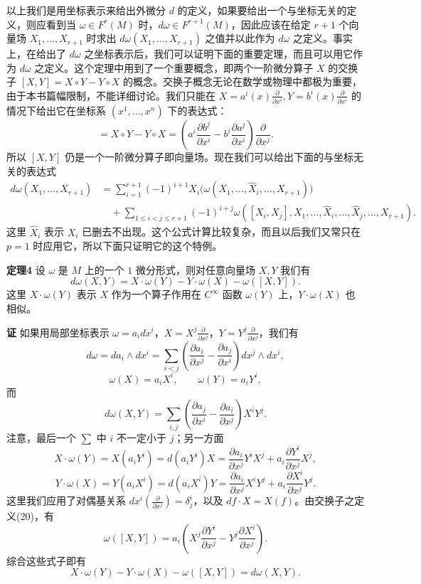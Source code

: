 以上我们是用坐标表示来给出外微分 $d$ 的定义，如果要给出一个与坐标无关的定义，则应看到当 $\omega\in F^r(M)$ 时，$d\omega\in F^{r+1}(M)$，因此应该在给定 $r+1$ 个向量场 $X_1,\ldots,X_{r+1}$ 时求出 $d\omega(X_1,\ldots,X_{r+1})$ 之值并以此作为 $d\omega$ 之定义。事实上，在给出了 $d\omega$ 之坐标表示后，我们可以证明下面的重要定理，而且可以用它作为 $d\omega$ 之定义。这个定理中用到了一个重要概念，即两个一阶微分算子 $X$ 的交换子 $[X,Y]=X\circ Y-Y\circ X$ 的概念。交换子概念无论在数学或物理中都极为重要，由于本书篇幅限制，不能详细讨论。我们只能在 $X=a^i(x)\frac{\partial}{\partial x^i},Y=b^i(x)\frac{\partial}{\partial x^i}$ 的情况下给出它在坐标系 $(x^1,\ldots,x^n)$ 下的表达式：
\begin{equation}
 [X,Y]=X\circ Y-Y\circ X
 =\left(a^i\frac{\partial b^j}{\partial x^i}-b^i\frac{\partial a^j}{\partial x^i}\right)\frac{\partial}{\partial x^j}.
 \tag{20}
\end{equation}
所以 $[X,Y]$ 仍是一个一阶微分算子即向量场。现在我们可以给出下面的与坐标无关的表达式
\begin{equation}
\begin{aligned}
 d\omega(X_1,\ldots,X_{r+1})
 &=\sum_{i=1}^{r+1}(-1)^{i+1}X_i\bigl(\omega(X_1,\ldots,\widehat X_i,\ldots,X_{r+1})\bigr)\\
 &\quad+\sum_{1\le i<j\le r+1}(-1)^{i+j}
 \omega([X_i,X_j],X_1,\ldots,\widehat X_i,\ldots,\widehat X_j,\ldots,X_{r+1}).
\end{aligned}
 \tag{21}
\end{equation}
这里 $\widehat X_i$ 表示 $X_i$ 已删去不出现。这个公式计算比较复杂，而且以后我们又常只在 $p=1$ 时应用它，所以下面只证明它的这个特例。

\noindent\textbf{定理4}
设 $\omega$ 是 $M$ 上的一个 $1$ 微分形式，则对任意向量场 $X,Y$ 我们有
\begin{equation}
 d\omega(X,Y)=X\cdot\omega(Y)-Y\cdot\omega(X)-\omega([X,Y]).
 \tag{22}
\end{equation}
这里 $X\cdot\omega(Y)$ 表示 $X$ 作为一个算子作用在 $C^\infty$ 函数 $\omega(Y)$ 上，$Y\cdot\omega(X)$ 也相似。

\noindent\textbf{证}
如果用局部坐标表示 $\omega=a_i dx^i$，$X=X^j\frac{\partial}{\partial x^j}$，$Y=Y^j\frac{\partial}{\partial x^j}$，我们有
\[
 d\omega=da_i\wedge dx^i
 =\sum_{i<j}\left(\frac{\partial a_i}{\partial x^j}-\frac{\partial a_j}{\partial x^i}\right)dx^j\wedge dx^i,
\]
\[
 \omega(X)=a_iX^i,\qquad \omega(Y)=a_iY^i,
\]
而
\[
 d\omega(X,Y)=\sum_{i,j}\left(\frac{\partial a_j}{\partial x^i}-\frac{\partial a_i}{\partial x^j}\right)X^iY^j.
\]
注意，最后一个 $\sum$ 中 $i$ 不一定小于 $j$；另一方面
\[
 X\cdot\omega(Y)=X(a_iY^i)=d(a_iY^i)X
 =\frac{\partial a_i}{\partial x^j}Y^iX^j+a_i\frac{\partial Y^i}{\partial x^j}X^j,
\]
\[
 Y\cdot\omega(X)=Y(a_iX^i)=d(a_iX^i)Y
 =\frac{\partial a_i}{\partial x^j}X^iY^j+a_i\frac{\partial X^i}{\partial x^j}Y^j.
\]
这里我们应用了对偶基关系 $dx^i(\frac{\partial}{\partial x^j})=\delta^i_j$，以及 $df\cdot X=X(f)$。由交换子之定义(20)，有
\[
 \omega([X,Y])=a_i\left(X^j\frac{\partial Y^i}{\partial x^j}-Y^j\frac{\partial X^i}{\partial x^j}\right).
\]
综合这些式子即有
\[
 X\cdot\omega(Y)-Y\cdot\omega(X)-\omega([X,Y])=d\omega(X,Y).
\]

